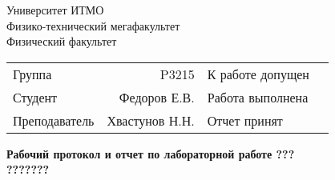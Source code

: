 \begin{titlepage}
\thispagestyle{firststyle}
\begin{center}
    Университет ИТМО \\
    Физико-технический мегафакультет \\
    Физический факультет \\
\end{center}
\vspace{1cm}
\begin{center}
    \begin{tabular}{ l r l c }
        Группа & P3215 & К работе допущен & \hspace{2cm}  \\\cline{4-4}
        Студент & Федоров Е.В. & Работа выполнена & \hspace{2cm} \\\cline{4-4}
        Преподаватель & Хвастунов Н.Н. & Отчет принят & \hspace{2cm} \\\cline{4-4}
    \end{tabular}
\end{center}

\vspace{2cm}

\begin{center}
    \Large
    \textbf{Рабочий протокол и отчет по
        лабораторной работе \textnumero ???
    }
    \\
    \huge
    \textbf{???????}
\end{center}
\end{titlepage}
